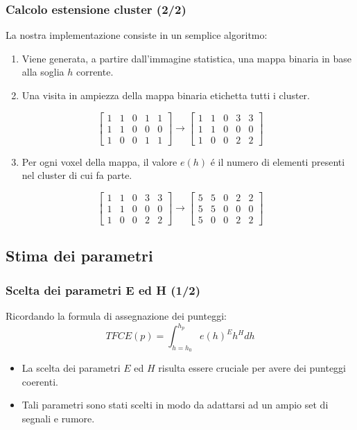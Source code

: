 \documentclass{beamer}
\begin{document}
\begin{frame}
\frametitle{Calcolo estensione cluster (2/2)}
La nostra implementazione consiste in un semplice algoritmo:
\begin{enumerate}
\item {}Viene generata, a partire dall'immagine statistica, una mappa binaria in base alla soglia $h$ corrente.
\item {}Una visita in ampiezza della mappa binaria etichetta tutti i cluster.
\end{enumerate}
\[
\begin{bmatrix}
    1       & 1 & 0 & 1 & 1\\
    1       & 1 & 0 & 0 & 0 \\
    1       & 0 & 0 & 1 & 1
\end{bmatrix}
\rightarrow
\begin{bmatrix}
    1       & 1 & 0 & 3 & 3\\
    1       & 1 & 0 & 0 & 0 \\
    1       & 0 & 0 & 2 & 2
\end{bmatrix}
\]
\begin{enumerate}
\setcounter{enumi}{2}
\item {}Per ogni voxel della mappa, il valore $e(h)$ \'e il numero di elementi presenti nel cluster di cui fa parte.
\end{enumerate}
\[
\begin{bmatrix}
    1       & 1 & 0 & 3 & 3\\
    1       & 1 & 0 & 0 & 0 \\
    1       & 0 & 0 & 2 & 2
\end{bmatrix}
\rightarrow
\begin{bmatrix}
    5       & 5 & 0 & 2 & 2 \\
    5       & 5 & 0 & 0 & 0 \\
    5       & 0 & 0 & 2 & 2
\end{bmatrix}
\]

\end{frame}

\subsection{Stima dei parametri}

\begin{frame}
\frametitle{Scelta dei parametri E ed H (1/2)}
Ricordando la formula di assegnazione dei punteggi:
$$TFCE(p)=\int_{h=h_0}^{h_p}e(h)^E h^H dh$$
\begin{itemize}
\item La scelta dei parametri $E$ ed $H$ risulta essere cruciale per avere dei punteggi coerenti.

\item Tali parametri sono stati scelti in modo da adattarsi ad un ampio set di segnali e rumore.

\end{itemize}
\end{frame}
\end{document}

